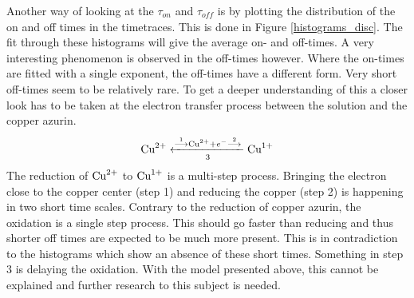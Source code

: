 \documentclass[twoside,single]{lion-msc}
\begin{document}
Another way of looking at the $\tau_{on}$ and  $\tau_{off}$ is by plotting the distribution of the on and off times in the timetraces. This is done in Figure \ref{histograms_disc}. The fit through these histograms will give the average on- and off-times. A very interesting phenomenon is observed in the off-times however. Where the on-times are fitted with a single exponent, the off-times have a different form. Very short off-times seem to be relatively rare. To get a deeper understanding of this a closer look has to be taken at the electron transfer process between the solution and the copper azurin.
\begin{equation}\label{ox_pros}
\textup{Cu}^{2+}\xleftarrow[3]{\overset{1}{\longrightarrow}\textup{Cu}^{2+}+ e^{-}\overset{2}{\longrightarrow}}\textup{Cu}^{1+}
\end{equation}
The reduction of $\textup{Cu}^{2+}$ to $\textup{Cu}^{1+}$ is a multi-step process. Bringing the electron close to the copper center (step 1) and reducing the copper (step 2) is happening in two short time scales. Contrary to the reduction of copper azurin, the oxidation is a single step process. This should go faster than reducing and thus shorter off times are expected to be much more present. This is in contradiction to the histograms which show an absence of these short times. Something in step 3 is delaying the oxidation. With the model presented above, this cannot be explained and further research to this subject is needed.
\end{document}
